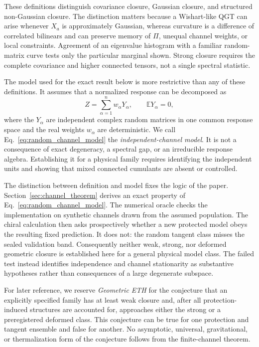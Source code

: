 These definitions distinguish covariance closure, Gaussian closure, and
structured non-Gaussian closure.  The distinction matters because a
Wishart-like QGT can arise whenever $X_a$ is approximately Gaussian, whereas
curvature is a difference of correlated bilinears and can preserve memory of
$\Pi$, unequal channel weights, or local constraints.  Agreement of an
eigenvalue histogram with a familiar random-matrix curve tests only the
particular marginal shown.  Strong closure requires the complete covariance
and higher connected tensors, not a single spectral statistic.

The model used for the exact result below is more restrictive than any of
these definitions.  It assumes that a normalized response can be decomposed
as
\begin{equation}
 Z=\sum_{\alpha=1}^{n}w_\alpha Y_\alpha,
 \qquad \mathbb E Y_\alpha=0,
 \label{eq:random_channel_model}
\end{equation}
where the $Y_\alpha$ are independent complex random matrices in one common
response space and the real weights $w_\alpha$ are deterministic.  We call
Eq.~\eqref{eq:random_channel_model} the \emph{independent-channel model}.
It is not a consequence of exact degeneracy, a spectral gap, or an
irreducible response algebra.  Establishing it for a physical family requires
identifying the independent units and showing that mixed connected
cumulants are absent or controlled.

The distinction between definition and model fixes the logic of the paper.
Section~\ref{sec:channel_theorem} derives an exact property of
Eq.~\eqref{eq:random_channel_model}.  The numerical oracle checks the
implementation on synthetic channels drawn from the assumed population.
The chiral calculation then asks prospectively whether a new protected model
obeys the resulting fixed prediction.  It does not: the random tangent class
misses the sealed validation band.  Consequently neither weak, strong, nor
deformed geometric closure is established here for a general physical model
class.  The failed test instead identifies independence and channel
stationarity as substantive hypotheses rather than consequences of a large
degenerate subspace.

For later reference, we reserve \emph{Geometric ETH} for the conjecture that
an explicitly specified family has at least weak closure and, after all
protection-induced structures are accounted for, approaches either the
strong or a preregistered deformed class.  This conjecture can be true for one
protection and tangent ensemble and false for another.  No asymptotic,
universal, gravitational, or thermalization form of the conjecture follows
from the finite-channel theorem.
